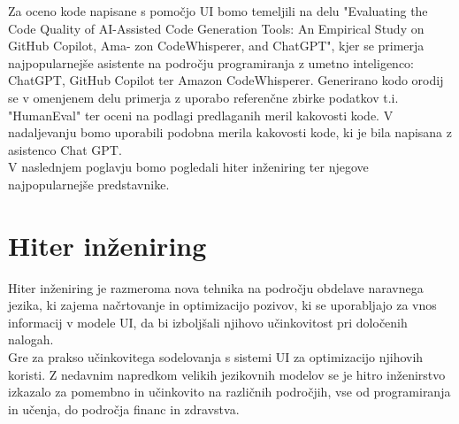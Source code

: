 \documentclass[a4paper,12pt,openright]{book}
\begin{document}
Za oceno kode napisane s pomočjo UI bomo temeljili na delu "Evaluating the Code Quality of AI-Assisted
Code Generation Tools: An Empirical Study on GitHub Copilot, Ama-
zon CodeWhisperer, and ChatGPT"\cite{yetistiren2023evaluating}, kjer se primerja najpopularnejše asistente na področju programiranja z umetno inteligenco: ChatGPT, GitHub Copilot ter Amazon CodeWhisperer. Generirano kodo orodij se v omenjenem delu primerja z uporabo referenčne zbirke podatkov t.i. "HumanEval" ter oceni na podlagi predlaganih meril kakovosti kode. V nadaljevanju bomo uporabili podobna merila kakovosti kode, ki je bila napisana z asistenco Chat GPT. \cite{7577432} \\
V naslednjem poglavju bomo pogledali hiter inženiring ter njegove najpopularnejše predstavnike.


\chapter{Hiter inženiring}

Hiter inženiring je razmeroma nova tehnika na področju obdelave naravnega jezika, ki zajema načrtovanje in optimizacijo pozivov, ki se uporabljajo za vnos informacij v modele UI, da bi izboljšali njihovo učinkovitost pri določenih nalogah. \cite{wang2024prompt} \\
Gre za prakso učinkovitega sodelovanja s sistemi UI za optimizacijo njihovih koristi. Z nedavnim napredkom velikih jezikovnih modelov se je hitro inženirstvo izkazalo za pomembno in učinkovito na različnih področjih, vse od programiranja in učenja, do področja financ in zdravstva. \cite{info:doi/10.2196/50638} \\
\end{document}
